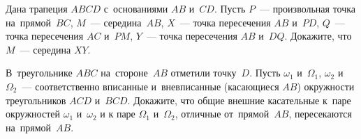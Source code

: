 \begin{problems}
\item
Дана трапеция $ABCD$ с~основаниями $AB$ и~$CD$.
Пусть $P$~--- произвольная точка на~прямой~$BC$,
$M$~--- середина~$AB$,
$X$~--- точка пересечения $AB$ и~$PD$,
$Q$~--- точка пересечения $AC$ и~$PM$,
$Y$~--- точка пересечения $AB$ и~$DQ$.
Докажите, что $M$~--- середина $XY$.

\item
В~треугольнике $ABC$ на~стороне~$AB$ отметили точку~$D$.
Пусть $\omega_1$ и~$\Omega_1$, $\omega_2$ и~$\Omega_2$~--- соответственно
вписанные и~вневписанные (касающиеся $AB$) окружности треугольников $ACD$
и~$BCD$.
Докажите, что общие внешние касательные
к~паре окружностей $\omega_1$ и~$\omega_2$
и к паре $\Omega_1$ и~$\Omega_2$, отличные от~прямой~$AB$, пересекаются
на~прямой~$AB$.

\end{problems}

